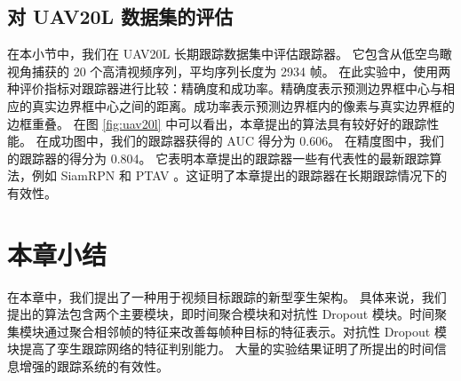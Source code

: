 \subsection{对 UAV20L 数据集的评估}
在本小节中，我们在 UAV20L \cite{mueller2016benchmark} 长期跟踪数据集中评估跟踪器。
它包含从低空鸟瞰视角捕获的 20 个高清视频序列，平均序列长度为 2934 帧。
在此实验中，使用两种评价指标对跟踪器进行比较：精确度和成功率。精确度表示预测边界框中心与相应的真实边界框中心之间的距离。成功率表示预测边界框内的像素与真实边界框的边框重叠。
在图 \ref{fig:uav20l} 中可以看出，本章提出的算法具有较好好的跟踪性能。
在成功图中，我们的跟踪器获得的 AUC 得分为 0.606。
在精度图中，我们的跟踪器的得分为 0.804。
它表明本章提出的跟踪器一些有代表性的最新跟踪算法，例如 SiamRPN \cite{SiamRPN} 和 PTAV \cite{fan2018parallel}。这证明了本章提出的跟踪器在长期跟踪情况下的有效性。

\section{本章小结}
在本章中，我们提出了一种用于视频目标跟踪的新型孪生架构。
具体来说，我们提出的算法包含两个主要模块，即时间聚合模块和对抗性 Dropout 模块。时间聚集模块通过聚合相邻帧的特征来改善每帧种目标的特征表示。对抗性 Dropout 模块提高了孪生跟踪网络的特征判别能力。
大量的实验结果证明了所提出的时间信息增强的跟踪系统的有效性。